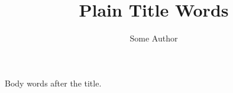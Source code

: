 \documentclass{article}
\title{Plain Title Words}
\author{Some Author}
\makeatletter
\renewcommand{\maketitle}{\begin{center}{\Large\bfseries \@title\par}\vspace{1em}{\large \@author\par}\end{center}}
\makeatother
\begin{document}
\maketitle
Body words after the title.
\end{document}

